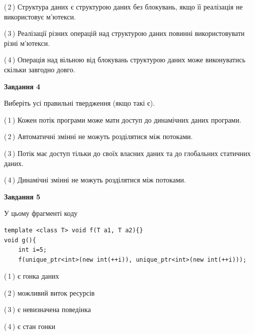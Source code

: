 \documentclass[12pt, ukrainian]{article}
\begin{document}
\begin {large}
{(\,2\,) Структура даних є структурою даних без блокувань, якщо її реалізація не використовує м’ютекси.%

(\,3\,) Реалізації різних операцій над структурою даних повинні використовувати різні м’ютекси.%

(\,4\,) Операція над вільною від блокувань структурою даних може виконуватись скільки завгодно довго.%



\begin{center}
\textbf{Завдання 4}
\end{center}
Виберіть усі правильні твердження (якщо такі є).\par
\vspace{2mm}

(\,1\,) Кожен потік програми може мати доступ до динамічних даних програми.%

(\,2\,) Автоматичні змінні не можуть розділятися між потоками.%

(\,3\,) Потік має доступ тільки до своїх власних даних та до глобальних статичних даних.%

(\,4\,) Динамічні змінні не можуть розділятися між потоками.%



\begin{center}
\textbf{Завдання 5}
\end{center}
У цьому фрагменті коду
\begin{verbatim}
template <class T> void f(T a1, T a2){}
void g(){
    int i=5;
    f(unique_ptr<int>(new int(++i)), unique_ptr<int>(new int(++i)));
\end{verbatim}

(\,1\,) є гонка даних%

(\,2\,) можливий виток ресурсів%

(\,3\,) є невизначена поведінка%

(\,4\,) є стан гонки%


}
\end {large}
\end{document}
